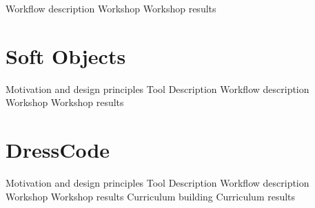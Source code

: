 		Workflow description
		Workshop
		Workshop results

	\section{Soft Objects}
		Motivation and design principles
		Tool Description
		Workflow description
		Workshop
		Workshop results
		
	\section{DressCode}
		Motivation and design principles
		Tool Description
		Workflow description
		Workshop
		Workshop results
		Curriculum building
		Curriculum results
